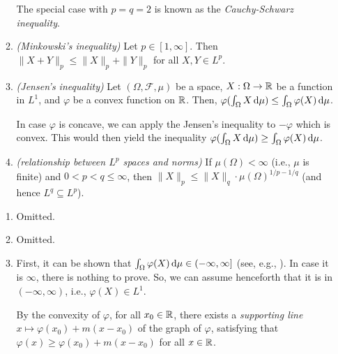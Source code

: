 \begin{enumerate}
\begin{enumerate}
\begin{note}
The special case with \(p=q=2\) is known as the \emph{Cauchy-Schwarz
inequality}.
\end{note}
\item\label{it:minkowski-ineq} \emph{(Minkowski's inequality)} Let \(p\in [1,\infty]\). Then
\(\|X+Y\|_{p}\le \|X\|_{p}+\|Y\|_{p}\) for all \(X,Y\in L^{p}\).
\item\label{it:jensen-ineq} \emph{(Jensen's inequality)} Let
\((\Omega,\mathcal{F},\mu)\) be a  space, \(X:\Omega\to\mathbb{R}\) be
a function in \(L^{1}\), and \(\varphi\) be a convex function
on \(\mathbb{R}\). Then, \(\varphi(\int_{\Omega}^{}X\odif{\mu})\le
\int_{\Omega}^{}\varphi(X)\odif{\mu}\).
\begin{note}
In case \(\varphi\) is concave, we can apply the Jensen's inequality to
\(-\varphi\) which is convex. This would then yield the inequality
\(\varphi(\int_{\Omega}^{}X\odif{\mu})\ge
\int_{\Omega}^{}\varphi(X)\odif{\mu}\).
\end{note}
\item\label{it:lp-sp-norm-relate} \emph{(relationship between \(L^{p}\) spaces
and norms)} If \(\mu(\Omega)<\infty\) (i.e., \(\mu\) is finite) and
\(0<p<q\le\infty\), then \(\|X\|_{p}\le
\|X\|_{q}\cdot \mu(\Omega)^{1/p-1/q}\) (and hence \(L^{q}\subseteq L^{p}\)).

\end{enumerate}
\begin{pf}
\begin{enumerate}
\item Omitted.
\item Omitted.
\item First, it can be shown that \(\int_{\Omega}^{}\varphi(X)\odif{\mu}\in
(-\infty,\infty]\) (see, e.g., \textcite[Theorem~7.9]{klenke2020probability}). In case it is \(\infty\), there is nothing to prove. So, we can assume henceforth that it is in \((-\infty,\infty)\), i.e., \(\varphi(X)\in L^{1}\).

By the convexity of \(\varphi\), for all \(x_0\in\mathbb{R}\), there
exists a \emph{supporting line} \(x\mapsto \varphi(x_0)+m(x-x_0)\) of the graph
of \(\varphi\), satisfying that \(\varphi(x)\ge\varphi(x_0)+m(x-x_0)\) for all
\(x\in\mathbb{R}\).


\end{enumerate}
\end{pf}
\end{enumerate}
